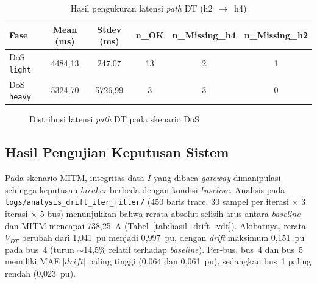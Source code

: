 \renewcommand{\arraystretch}{1.3}
\begin{table}[htbp]
    \centering
    \caption{Hasil pengukuran latensi \textit{path} \ac{DT} (h2~$\rightarrow$~h4)}
    \label{tab:hasil_dt_path}
    \begin{tabular}{|l|c|c|c|c|c|}
        \hline
        \textbf{Fase} & \textbf{Mean (ms)} & \textbf{Stdev (ms)} & \textbf{n\_OK} & \textbf{n\_Missing\_h4} & \textbf{n\_Missing\_h2} \\ \hline
        \ac{DoS} \texttt{light} & 4484{,}13 & 247{,}07  & 13 & 2 & 1 \\ \hline
        \ac{DoS} \texttt{heavy} & 5324{,}70 & 5726{,}99 & 3  & 3 & 0 \\ \hline
    \end{tabular}
\end{table}

\begin{figure}[htbp]
    \centering
    \caption{Distribusi latensi \textit{path} \ac{DT} pada skenario \ac{DoS}}
    \label{fig:hasil_dt_path}
\end{figure}

\subsection{Hasil Pengujian Keputusan Sistem}
\label{subsec:hasil_pengujian_keputusan_sistem}
Pada skenario \ac{MITM}, integritas data $I$ yang dibaca \textit{gateway} dimanipulasi sehingga keputusan \textit{breaker} berbeda dengan kondisi \textit{baseline}. Analisis pada \texttt{logs/analysis\_drift\_iter\_filter/} (450 baris trace, 30 sampel per iterasi $\times$ 3 iterasi $\times$ 5 bus) menunjukkan bahwa rerata absolut selisih arus antara \textit{baseline} dan \ac{MITM} mencapai 738{,}25~A (Tabel~\ref{tab:hasil_drift_vdt}). Akibatnya, rerata $V_{DT}$ berubah dari 1{,}041~pu menjadi 0{,}997~pu, dengan \textit{drift} maksimum 0{,}151~pu pada bus~4 (turun $\sim$14{,}5\% relatif terhadap \textit{baseline}). Per-bus, bus~4 dan bus~5 memiliki MAE $|drift|$ paling tinggi (0{,}064 dan 0{,}061~pu), sedangkan bus~1 paling rendah (0{,}023~pu).

